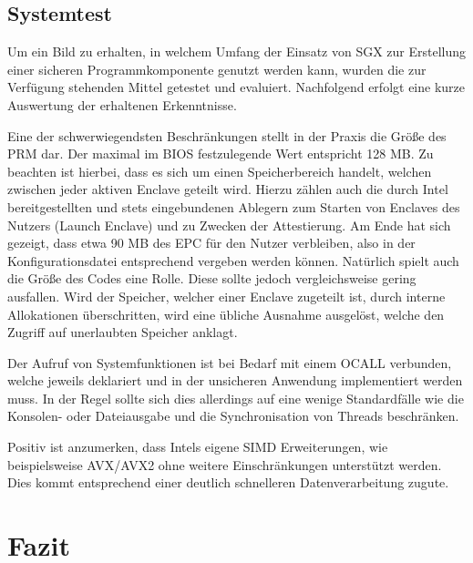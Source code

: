 \subsection{Systemtest}

Um ein Bild zu erhalten, in welchem Umfang der Einsatz von SGX zur Erstellung einer sicheren Programmkomponente genutzt werden kann, wurden die zur Verfügung stehenden Mittel getestet und evaluiert. Nachfolgend erfolgt eine kurze Auswertung der erhaltenen Erkenntnisse.

Eine der schwerwiegendsten Beschränkungen stellt in der Praxis die Größe des PRM dar. Der maximal im BIOS festzulegende Wert entspricht 128 MB. Zu beachten ist hierbei, dass es sich um einen Speicherbereich handelt, welchen zwischen jeder aktiven Enclave geteilt wird. Hierzu zählen auch die durch Intel bereitgestellten und stets eingebundenen Ablegern zum Starten von Enclaves des Nutzers (Launch Enclave) und zu Zwecken der Attestierung. Am Ende hat sich gezeigt, dass etwa 90 MB des EPC für den Nutzer verbleiben, also in der Konfigurationsdatei entsprechend vergeben werden können. Natürlich spielt auch die Größe des Codes eine Rolle. Diese sollte jedoch vergleichsweise gering ausfallen. Wird der Speicher, welcher einer Enclave zugeteilt ist, durch interne Allokationen überschritten, wird eine übliche Ausnahme ausgelöst, welche den Zugriff auf unerlaubten Speicher anklagt.

Der Aufruf von Systemfunktionen ist bei Bedarf mit einem OCALL verbunden, welche jeweils deklariert und in der unsicheren Anwendung implementiert werden muss. In der Regel sollte sich dies allerdings auf eine wenige Standardfälle wie die Konsolen- oder Dateiausgabe und die Synchronisation von Threads beschränken.

Positiv ist anzumerken, dass Intels eigene SIMD Erweiterungen, wie beispielsweise AVX/AVX2 ohne weitere Einschränkungen unterstützt werden. Dies kommt entsprechend einer deutlich schnelleren Datenverarbeitung zugute.

\section{Fazit}

